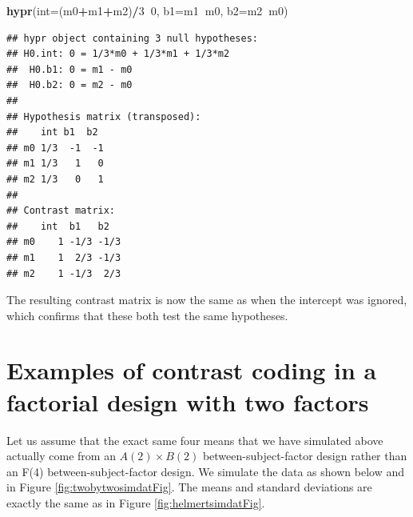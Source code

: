\documentclass[12pt,]{krantz}
\newenvironment{Shaded}{\begin{snugshade}}{\end{snugshade}}
\newcommand{\DataTypeTok}[1]{\textcolor[rgb]{0.13,0.29,0.53}{#1}}
\newcommand{\DecValTok}[1]{\textcolor[rgb]{0.00,0.00,0.81}{#1}}
\newcommand{\KeywordTok}[1]{\textcolor[rgb]{0.13,0.29,0.53}{\textbf{#1}}}
\newcommand{\NormalTok}[1]{#1}
\newcommand{\OperatorTok}[1]{\textcolor[rgb]{0.81,0.36,0.00}{\textbf{#1}}}
\theoremstyle{definition}
\theoremstyle{definition}
\theoremstyle{definition}
\theoremstyle{remark}
\begin{document}
\begin{Shaded}
\begin{Highlighting}[]
\KeywordTok{hypr}\NormalTok{(}\DataTypeTok{int=}\NormalTok{(m0}\OperatorTok{+}\NormalTok{m1}\OperatorTok{+}\NormalTok{m2)}\OperatorTok{/}\DecValTok{3}\OperatorTok{~}\DecValTok{0}\NormalTok{, }\DataTypeTok{b1=}\NormalTok{m1}\OperatorTok{~}\NormalTok{m0, }\DataTypeTok{b2=}\NormalTok{m2}\OperatorTok{~}\NormalTok{m0)}
\end{Highlighting}
\end{Shaded}

\begin{verbatim}
## hypr object containing 3 null hypotheses:
## H0.int: 0 = 1/3*m0 + 1/3*m1 + 1/3*m2
##  H0.b1: 0 = m1 - m0
##  H0.b2: 0 = m2 - m0
## 
## Hypothesis matrix (transposed):
##    int b1  b2 
## m0 1/3  -1  -1
## m1 1/3   1   0
## m2 1/3   0   1
## 
## Contrast matrix:
##    int  b1   b2  
## m0    1 -1/3 -1/3
## m1    1  2/3 -1/3
## m2    1 -1/3  2/3
\end{verbatim}

The resulting contrast matrix is now the same as when the intercept was ignored, which confirms that these both test the same hypotheses.

\hypertarget{MR_ANOVA}{%
\section{Examples of contrast coding in a factorial design with two factors}\label{MR_ANOVA}}

Let us assume that the exact same four means that we have simulated above actually come from an \(A(2) \times B(2)\) between-subject-factor design rather than an F(4) between-subject-factor design. We simulate the data as shown below and in Figure \ref{fig:twobytwosimdatFig}. The means and standard deviations are exactly the same as in Figure \ref{fig:helmertsimdatFig}.
\end{document}
